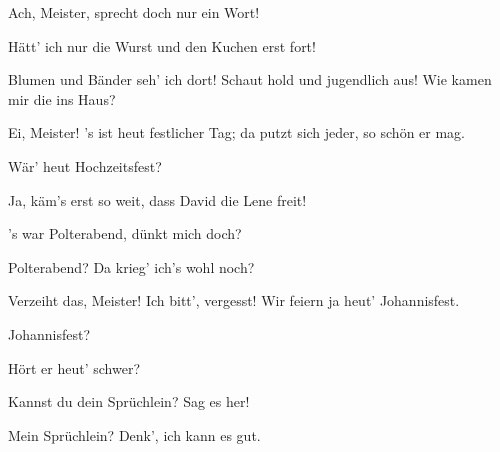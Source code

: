 \begin{drama}

Ach, Meister, sprecht doch nur ein Wort!


Hätt' ich nur die Wurst und den Kuchen erst fort!

\Sachsspeaks


Blumen und Bänder seh' ich dort!
Schaut hold und jugendlich aus!
Wie kamen mir die ins Haus?

\Davidspeaks


Ei, Meister! 's ist heut festlicher Tag;
da putzt sich jeder, so schön er mag.

\Sachsspeaks


Wär' heut Hochzeitsfest?

\Davidspeaks
Ja, käm's erst so weit, dass David die Lene freit!

\Sachsspeaks


's war Polterabend, dünkt mich doch?

\Davidspeaks


Polterabend? Da krieg' ich's wohl noch?


Verzeiht das, Meister! Ich bitt', vergesst!
Wir feiern ja heut' Johannisfest.

\Sachsspeaks
Johannisfest?

\Davidspeaks


Hört er heut' schwer?

\Sachsspeaks
Kannst du dein Sprüchlein? Sag es her!

\Davidspeaks


Mein Sprüchlein? Denk', ich kann es gut.


\end{drama}
